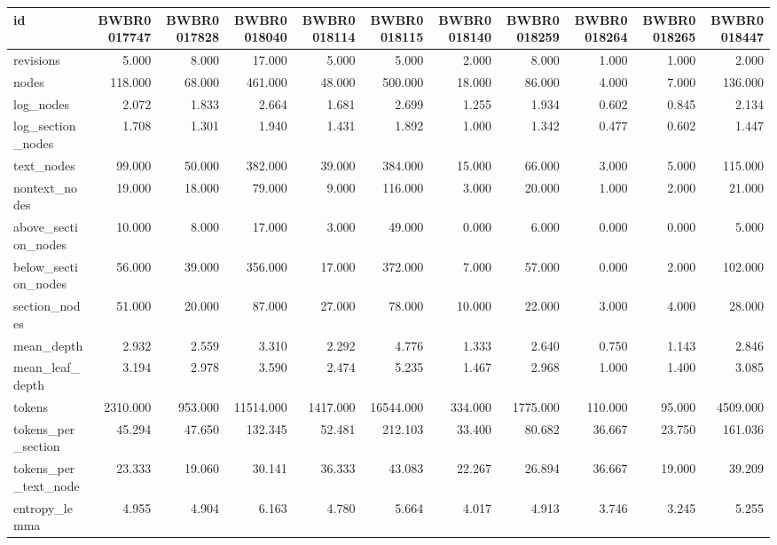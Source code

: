 \begin{tabular}{lrrrrrrrrrr}
\toprule
id & BWBR0017747 & BWBR0017828 & BWBR0018040 & BWBR0018114 & BWBR0018115 & BWBR0018140 & BWBR0018259 & BWBR0018264 & BWBR0018265 & BWBR0018447 \\
\midrule
revisions & 5.000 & 8.000 & 17.000 & 5.000 & 5.000 & 2.000 & 8.000 & 1.000 & 1.000 & 2.000 \\
\cline{1-11}
nodes & 118.000 & 68.000 & 461.000 & 48.000 & 500.000 & 18.000 & 86.000 & 4.000 & 7.000 & 136.000 \\
\cline{1-11}
log\_nodes & 2.072 & 1.833 & 2.664 & 1.681 & 2.699 & 1.255 & 1.934 & 0.602 & 0.845 & 2.134 \\
\cline{1-11}
log\_section\_nodes & 1.708 & 1.301 & 1.940 & 1.431 & 1.892 & 1.000 & 1.342 & 0.477 & 0.602 & 1.447 \\
\cline{1-11}
text\_nodes & 99.000 & 50.000 & 382.000 & 39.000 & 384.000 & 15.000 & 66.000 & 3.000 & 5.000 & 115.000 \\
\cline{1-11}
nontext\_nodes & 19.000 & 18.000 & 79.000 & 9.000 & 116.000 & 3.000 & 20.000 & 1.000 & 2.000 & 21.000 \\
\cline{1-11}
above\_section\_nodes & 10.000 & 8.000 & 17.000 & 3.000 & 49.000 & 0.000 & 6.000 & 0.000 & 0.000 & 5.000 \\
\cline{1-11}
below\_section\_nodes & 56.000 & 39.000 & 356.000 & 17.000 & 372.000 & 7.000 & 57.000 & 0.000 & 2.000 & 102.000 \\
\cline{1-11}
section\_nodes & 51.000 & 20.000 & 87.000 & 27.000 & 78.000 & 10.000 & 22.000 & 3.000 & 4.000 & 28.000 \\
\cline{1-11}
mean\_depth & 2.932 & 2.559 & 3.310 & 2.292 & 4.776 & 1.333 & 2.640 & 0.750 & 1.143 & 2.846 \\
\cline{1-11}
mean\_leaf\_depth & 3.194 & 2.978 & 3.590 & 2.474 & 5.235 & 1.467 & 2.968 & 1.000 & 1.400 & 3.085 \\
\cline{1-11}
tokens & 2310.000 & 953.000 & 11514.000 & 1417.000 & 16544.000 & 334.000 & 1775.000 & 110.000 & 95.000 & 4509.000 \\
\cline{1-11}
tokens\_per\_section & 45.294 & 47.650 & 132.345 & 52.481 & 212.103 & 33.400 & 80.682 & 36.667 & 23.750 & 161.036 \\
\cline{1-11}
tokens\_per\_text\_node & 23.333 & 19.060 & 30.141 & 36.333 & 43.083 & 22.267 & 26.894 & 36.667 & 19.000 & 39.209 \\
\cline{1-11}
entropy\_lemma & 4.955 & 4.904 & 6.163 & 4.780 & 5.664 & 4.017 & 4.913 & 3.746 & 3.245 & 5.255 \\

\end{tabular}
